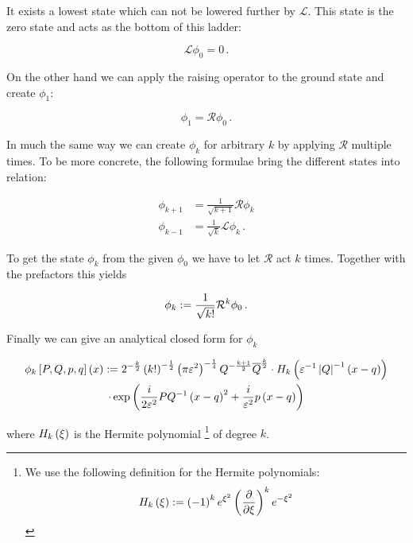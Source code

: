 It exists a lowest state which can not be lowered further by $\mathcal{L}$. This
state is the zero state and acts as the bottom of this ladder:

\begin{equation} \label{eq:ladder_ops_base}
  \mathcal{L} \phi_0 = 0 \,.
\end{equation}

On the other hand we can apply the raising operator to the ground state and create $\phi_1$:

\begin{equation} \label{eq:ladder_ops_phi_0}
  \phi_1 = \mathcal{R} \phi_0 \,.
\end{equation}

In much the same way we can create $\phi_k$ for arbitrary $k$ by applying $\mathcal{R}$
multiple times. To be more concrete, the following formulae bring the different
states into relation:

\begin{equation} \label{eq:applied_ladder_ops}
\begin{split}
  \phi_{k+1} & = \frac{1}{\sqrt{k+1}} \mathcal{R} \phi_k \\
  \phi_{k-1} & = \frac{1}{\sqrt{k}} \mathcal{L} \phi_k \,.
\end{split}
\end{equation}

To get the state $\phi_k$ from the given $\phi_0$ we have to let $\mathcal{R}$ act $k$
times. Together with the prefactors this yields

\begin{equation}
  \phi_k := \frac{1}{\sqrt{k!}} \mathcal{R}^k \phi_0 \,.
\end{equation}

Finally we can give an analytical closed form for $\phi_k$

\begin{multline} \label{eq:hagedorn_kstate_1d}
  \phi_k \left[ P,Q,p,q \right] \left( x \right)
  :=
  2^{-\frac{k}{2}}\left(k!\right)^{-\frac{1}{2}}\left(\pi\varepsilon^2\right)^{-\frac{1}{4}} Q^{-\frac{k+1}{2}}\overline{Q}^{\frac{k}{2}}
  \cdot H_k\left( \varepsilon^{-1}\left|Q\right|^{-1}\left(x-q\right) \right) \\
  \cdot \exp \left(\frac{i}{2\varepsilon^2} PQ^{-1}\left(x-q\right)^2 + \frac{i}{\varepsilon^2} p\left(x-q\right) \right)
\end{multline}

where $H_k\left( \xi \right)$ is the Hermite polynomial \footnote{
We use the following definition for the Hermite polynomials:
\begin{equation}
  H_k\left( \xi \right) := \left(-1\right)^k e^{\xi^2} \left( \frac{\partial}{\partial\xi} \right)^k e^{-\xi^2}
\end{equation}}
of degree $k$.

